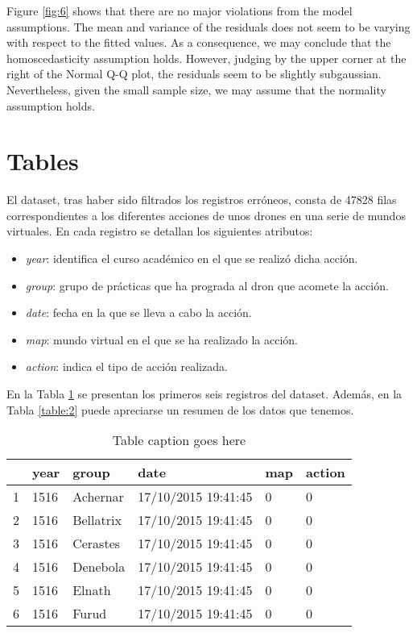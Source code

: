 \documentclass[10pt,a4paper]{article}
\begin{document}
Figure \ref{fig:6} shows that there are no major violations from the model assumptions. The mean and variance of the residuals does not seem to be varying with respect to the fitted values. As a consequence, we may conclude that the homoscedasticity assumption holds. However, judging by the upper corner at the right of the Normal Q-Q plot, the residuals seem to be slightly subgaussian. Nevertheless, given the small sample size, we may assume that the normality assumption holds.

\section{Tables}

El dataset, tras haber sido filtrados los registros erróneos, consta de 47828 filas correspondientes a los diferentes acciones de unos drones en una serie de mundos virtuales. En cada registro se detallan los siguientes atributos:
\begin{itemize}
\item \emph{year}: identifica el curso académico en el que se realizó dicha acción.
\item \emph{group}: grupo de prácticas que ha prograda al dron que acomete la acción.
\item \emph{date}: fecha en la que se lleva a cabo la acción.
\item \emph{map}: mundo virtual en el que se ha realizado la acción.
\item \emph{action}: indica el tipo de acción realizada.
\end{itemize}

En la Tabla \ref{table:1} se presentan los primeros seis registros del dataset. Además, en la Tabla \ref{table:2} puede apreciarse un resumen de los datos que tenemos.

\begin{table}[ht]
\centering
\begin{tabular}{rlllll}
  \hline
 & year & group & date & map & action \\ 
  \hline
1 & 1516 & Achernar & 17/10/2015 19:41:45 & 0 & 0 \\ 
  2 & 1516 & Bellatrix & 17/10/2015 19:41:45 & 0 & 0 \\ 
  3 & 1516 & Cerastes & 17/10/2015 19:41:45 & 0 & 0 \\ 
  4 & 1516 & Denebola & 17/10/2015 19:41:45 & 0 & 0 \\ 
  5 & 1516 & Elnath & 17/10/2015 19:41:45 & 0 & 0 \\ 
  6 & 1516 & Furud & 17/10/2015 19:41:45 & 0 & 0 \\ 
   \hline
\end{tabular}
\caption{Table caption goes here}
\label{table:1}
\end{table}
\end{document}
